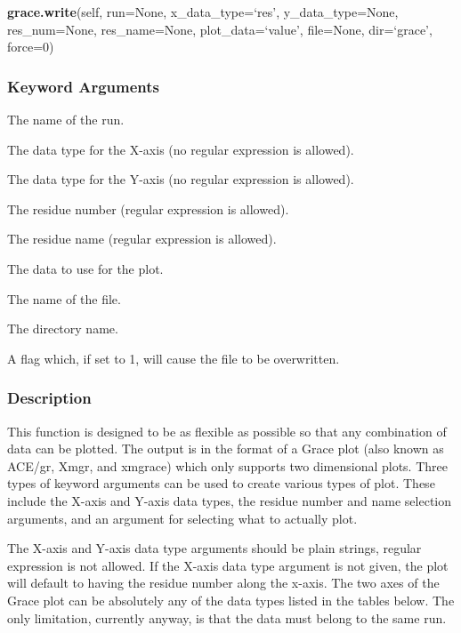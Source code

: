 \textsf{\textbf{grace.write}(self, run=None, x\_data\_type=`res', y\_data\_type=None, res\_num=None, res\_name=None, plot\_data=`value', file=None, dir=`grace', force=0)}


\subsubsection{Keyword Arguments}


  The name of the run.

  The data type for the X-axis (no regular expression  is allowed).

  The data type for the Y-axis (no regular expression  is allowed).

  The residue number (regular expression is allowed).

  The residue name (regular expression is allowed).

  The data to use for the plot. 

  The name of the file.

  The directory name.

  A flag which, if set to 1, will cause the file to be overwritten.

\subsubsection{Description}

This function is designed to be as flexible as possible so that any combination of data can
be plotted.   The output is in the format of a Grace  plot  (also known as ACE/gr, Xmgr, and
xmgrace) which only supports two dimensional plots.   Three types of keyword arguments can
be used to create various types of plot.   These include the X-axis and Y-axis data types,
the residue number and name selection arguments, and an argument for selecting what to
actually plot. 

The X-axis and Y-axis data type arguments should be plain strings, regular expression  is not
allowed.  If the X-axis data type argument is not given, the plot  will default to having the
residue number along the x-axis.  The two axes of the Grace  plot  can be absolutely any of
the data types listed in the tables below.  The only limitation,  currently anyway, is that
the data must belong to the same run.

